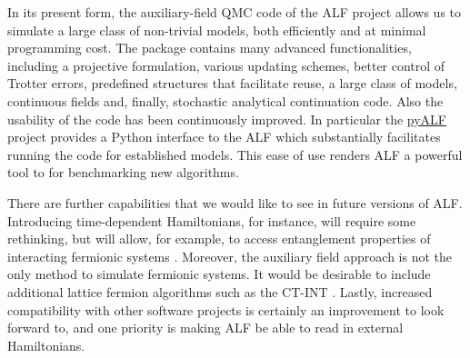 
In its present form, the  auxiliary-field QMC code of the ALF project allows us to simulate a large class of non-trivial models, both efficiently and at minimal  programming cost. The package contains many advanced functionalities, including a projective formulation, various updating schemes, better control of Trotter errors, predefined structures that facilitate reuse, a large class of models, continuous fields and, finally, stochastic analytical continuation code. Also the usability of the code has been continuously improved. In particular the \href{https://git.physik.uni-wuerzburg.de/ALF/pyALF/-/tree/\pyALFbranch}{pyALF} project provides a Python interface to the ALF which substantially facilitates running the code for established models.  This ease of use renders ALF a powerful tool to for benchmarking new algorithms. 

There are further capabilities that we would like to see in future versions of ALF. Introducing time-dependent Hamiltonians, for instance, will require some rethinking, but will allow, for example, to access entanglement properties of interacting fermionic systems \cite{Broecker14,Assaad13a,Assaad15}. Moreover, the auxiliary field approach is not the only method to simulate fermionic systems. 
It would be desirable to include additional lattice fermion algorithms such as the CT-INT \cite{Rubtsov05,Assaad07}.
Lastly, increased compatibility with other software projects is certainly an improvement to look forward to, and one priority is making ALF be able to read in external Hamiltonians.
